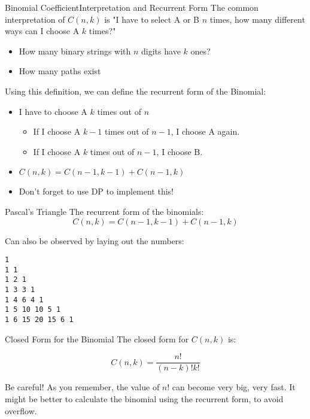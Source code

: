 \begin{frame}[fragile]{Binomial Coefficient}{Interpretation and Recurrent Form}
  The common interpretation of $C(n,k)$ is "I have to select A or B $n$ times, how many different ways can I choose A $k$ times?"
  \begin{itemize}
    \item How many binary strings with $n$ digits have $k$ ones?
    \item How many paths exist
  \end{itemize}\bigskip

  Using this definition, we can define the recurrent form of the Binomial:
  \begin{itemize}
    \item I have to choose A $k$ times out of $n$
    \begin{itemize}
      \item If I choose A $k-1$ times out of $n-1$, I choose A again.
      \item If I choose A $k$ times out of $n-1$, I choose B.
    \end{itemize}
    \item $C(n,k) = C(n-1,k-1) + C(n-1,k)$
    \item Don't forget to use DP to implement this!
  \end{itemize}\bigskip
\end{frame}

\begin{frame}[fragile]{Pascal's Triangle}
  The recurrent form of the binomials:
  \begin{equation*}
    C(n,k) = C(n-1,k-1) + C(n-1,k)
  \end{equation*}

  Can also be observed by laying out the numbers:

\begin{verbatim}
1
1 1
1 2 1
1 3 3 1
1 4 6 4 1
1 5 10 10 5 1
1 6 15 20 15 6 1
\end{verbatim}
\end{frame}

\begin{frame}{Closed Form for the Binomial}
  The closed form for $C(n,k)$ is:\bigskip

    \begin{equation*}
      C(n,k) = \frac{n!}{(n-k)!k!}
    \end{equation*}\bigskip

  Be careful! As you remember, the value of $n!$ can become very big,
  very fast. It might be better to calculate the binomial using the recurrent
  form, to avoid overflow.
\end{frame}

